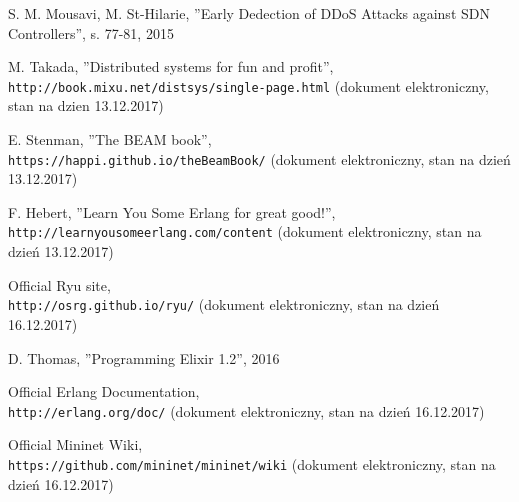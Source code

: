 \begin{thebibliography}{99}
S. M. Mousavi, M. St-Hilarie,
''Early Dedection of DDoS Attacks against SDN Controllers'',
s. 77-81, 2015

M. Takada,
''Distributed systems for fun and profit'',
\\\texttt{http://book.mixu.net/distsys/single-page.html} (dokument
elektroniczny, stan na dzien 13.12.2017)

E. Stenman,
''The BEAM book'',
\\\texttt{https://happi.github.io/theBeamBook/} (dokument elektroniczny, stan na
dzień 13.12.2017)

F. Hebert,
''Learn You Some Erlang for great good!'',
\\\texttt{http://learnyousomeerlang.com/content} (dokument elektroniczny, stan
na dzień 13.12.2017)

Official Ryu site,
\\\texttt{http://osrg.github.io/ryu/} (dokument elektroniczny, stan
na dzień 16.12.2017)

D. Thomas,
''Programming Elixir 1.2'',
2016 

Official Erlang Documentation,
\\\texttt{http://erlang.org/doc/} (dokument elektroniczny, stan
na dzień 16.12.2017)

Official Mininet Wiki,
\\\texttt{https://github.com/mininet/mininet/wiki} (dokument elektroniczny, stan
na dzień 16.12.2017)
\end{thebibliography}